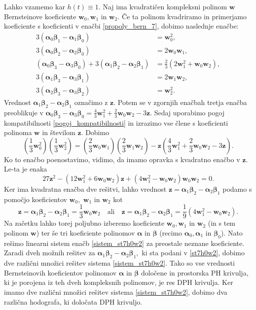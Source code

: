 \documentclass[12pt,a4paper,twoside]{article}
\theoremstyle{definition} %
\theoremstyle{plain} %
\theoremstyle{primerstyle}
\numberwithin{equation}{section}  %
\newcommand{\wV}{\mathbf{w}}
\newcommand{\zV}{\mathbf{z}}
\newcommand{\balpha}{\boldsymbol \alpha}
\newcommand{\bbeta}{\boldsymbol \beta}
\begin{document}
Lahko vzamemo kar $h(t)\equiv1.$ Naj ima kvadratičen kompleksni polinom $\wV$ Bernsteinove koeficiente $\wV_0,\wV_1$ in $\wV_2.$ Če ta polinom kvadriramo in primerjamo koeficiente s koeficienti v enačbi \eqref{propoly_bern_7}, dobimo naslednje enačbe:
\begin{align}
	3(\balpha_0\bbeta_1-\balpha_1\bbeta_0)&=\wV_0^2,\nonumber\\
	3(\balpha_0\bbeta_2-\balpha_2\bbeta_0)&=2\wV_0\wV_1,\nonumber\\
	(\balpha_0\bbeta_3-\balpha_3\bbeta_0)+3(\balpha_1\bbeta_2-\balpha_2\bbeta_1)&=\frac{2}{3}(2\wV_1^2+\wV_0\wV_2),\label{sistem_st7h0w2}\\
	3(\balpha_1\bbeta_3-\balpha_3\bbeta_1)&=2\wV_1\wV_2,\nonumber\\
	3(\balpha_2\bbeta_3-\balpha_3\bbeta_2)&=\wV_2^2.\nonumber
\end{align}
Vrednost $\balpha_1\bbeta_2-\balpha_2\bbeta_1$ označimo z $\zV.$ Potem se v zgornjih enačbah tretja enačba preoblikuje v $\balpha_0\bbeta_3-\balpha_3\bbeta_0=\frac{4}{3}\wV_1^2+\frac{2}{3}\wV_0\wV_2-3\zV.$ Sedaj uporabimo pogoj kompatibilnosti \eqref{pogoj_kompatibilnosti} in izrazimo vse člene s koeficienti polinoma $\wV$ in številom $\zV.$ Dobimo
\begin{equation*}
	\left(\frac{1}{3}\wV_0^2\right)\left(\frac{1}{3}\wV_2^2\right)=\left(\frac{2}{3}\wV_0\wV_1\right)\left(\frac{2}{3}\wV_1\wV_2\right)-\zV\left(\frac{4}{3}\wV_1^2+\frac{2}{3}\wV_0\wV_2-3\zV\right).
\end{equation*}
Ko to enačbo poenostavimo, vidimo, da imamo opravka s kvadratno enačbo v $\zV.$ Le-ta je enaka
\begin{equation*}
	27\zV^2-(12\wV_1^2+6\wV_0\wV_2)\zV+(4\wV_1^2-\wV_0\wV_2)\wV_0\wV_2=0.
\end{equation*}
Ker ima kvadratna enačba dve rešitvi, lahko vrednost $\zV=\balpha_1\bbeta_2-\balpha_2\bbeta_1$ podamo s pomočjo koeficientov $\wV_0,$ $\wV_1$ in $\wV_2$ kot
\begin{equation}
	\label{st7h0w2}
	\zV=\balpha_1\bbeta_2-\balpha_2\bbeta_1=\frac{1}{3}\wV_0\wV_2\quad\text{ali}\quad\zV=\balpha_1\bbeta_2-\balpha_2\bbeta_1=\frac{1}{9}(4\wV_1^2-\wV_0\wV_2).
\end{equation}
Na začetku lahko torej poljubno izberemo koeficiente $\wV_0,\wV_1$ in $\wV_2$ (in s tem polinom $\wV$) ter še tri koeficiente polinomov $\balpha$ in $\bbeta$ (recimo $\balpha_0,\balpha_1$ in $\bbeta_0$). Nato rešimo linearni sistem enačb \eqref{sistem_st7h0w2} za preostale neznane koeficiente. Zaradi dveh možnih rešitev za $\balpha_1\bbeta_2-\balpha_2\bbeta_1,$ ki sta podani v \eqref{st7h0w2}, dobimo dve različni množici rešitev sistema \eqref{sistem_st7h0w2}. Tako so vse vrednosti Bernsteinovih koeficientov polinomov $\balpha$ in $\bbeta$ določene in prostorska PH krivulja, ki je porojena iz teh dveh kompleksnih polinomov, je res DPH krivulja. Ker imamo dve različni množici rešitev sistema \eqref{sistem_st7h0w2}, dobimo dva različna hodografa, ki določata DPH krivuljo.
\end{document}
